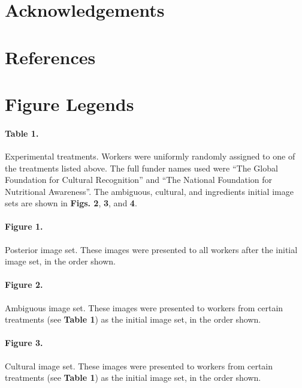 \documentclass[a4paper]{report}
\begin{document}
\section*{Acknowledgements}
\section*{References}
\begingroup
\renewcommand{\chapter}[2]{}

\endgroup
 

\section*{Figure Legends}

\paragraph{Table 1.}
	Experimental treatments.  Workers were uniformly randomly
	assigned to one of the treatments listed above.  The full funder 
	names used were ``The Global Foundation
	for Cultural Recognition'' and ``The National Foundation for 
	Nutritional Awareness''.  The ambiguous, cultural, and ingredients 
	initial image sets are shown in \textbf{Figs. 2}, \textbf{3}, and 
	\textbf{4}.

\paragraph{Figure 1.}
	Posterior image set. These images were presented to all workers after the 
	initial image set, in the order shown. 

\paragraph{Figure 2.}
	Ambiguous image set. These images were presented to workers from certain
	treatments (see \textbf{Table 1}) as the initial image set, in the order 
	shown.  

\paragraph{Figure 3.}
	Cultural image set. These images were presented to workers from 
	certain treatments (see \textbf{Table 1}) as the initial image set, in the 
	order shown.  
\end{document}

